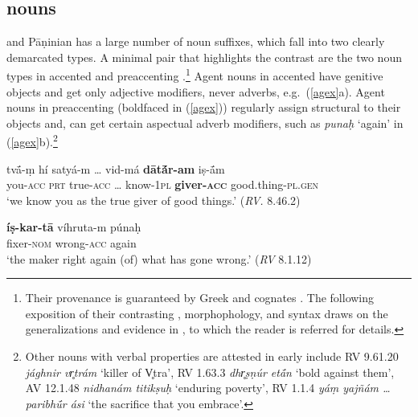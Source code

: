 \documentclass[output=paper,
modfonts
]{LSP/langsci}
\newcommand{\rf}[1]{(\ref{#1})}
\newcommand{\rfa}[2]{(\ref{#1}{#2})}
\def\urf#1{$^{\textrm{\scriptsize{#1}}}$}
\begin{document}
\subsection{  nouns}

 and Pāṇinian  has a large number of  noun suffixes, which fall into two
clearly demarcated types.  A minimal pair that highlights the contrast are the two  noun
types in accented \form{-tár-\urf{N}} and preaccenting \form{′-tar-\urf{V}}.\footnote{Their
   provenance is guaranteed by Greek and  cognates \citep{lowe2014}.  The
  following exposition of their contrasting , morphophology, and syntax draws on the
  generalizations and evidence in \citealt{kiparsky2016}, to which the reader is referred for details.}
Agent nouns in accented \form{-tár-\urf{N}} have genitive objects and get only adjective
modifiers, never adverbs, e.g.\ \rfa{agex}{a}.  Agent nouns in preaccenting
\form{′-tar-\urf{V}} (boldfaced in \rf{agex}) regularly assign structural  to their
objects and, can get certain aspectual adverb  modifiers, such as \textit{punaḥ} `again' in
\rfa{agex}{b}.\footnote{Other  nouns with verbal properties are attested in early 
  include \form{-i-\urf{V}} RV 9.61.20 \textit{jághnir vr̥trám} `killer of V̥tra',
  \form{-(i)ṣṇu-\urf{V}} RV 1.63.3 \textit{dhr̥ṣṇúr etā́n} `bold against them',
  \form{-u-\urf{V}} AV 12.1.48 \textit{nidhanám titikṣuḥ} `enduring poverty',
  \form{-∅-\urf{V}} RV 1.1.4 \textit{yáṃ yajñám … paribhū́r ási} `the sacrifice that you
  embrace'.}
\begin{exe}
\ex\label{agex}
	\ea \gll tvā́-ṃ  hí  {satyá-m} … vid-má  \textbf{dātā́r-am}  {iṣ-ā́m} \\
	you-\textsc{acc} \textsc{prt} {true-\textsc{acc}} … know-\textsc{1pl} \textbf{giver-\textsc{acc}} {good.thing-\textsc{pl}.\textsc{gen}}\\
	\glt  `we know you as the true giver of good things.' \hfill (\textit{RV.} 8.46.2)

	\ex \gll \textbf{íṣ-kar-tā} {víhruta-m} {púnaḥ}\\
	fixer-\textsc{nom} {wrong-\textsc{acc}}  {again}\\
	 \glt `the maker right again (of) what has gone wrong.' \hfill (\textit{RV} 8.1.12)
	\z 
\end{exe}
\end{document}
